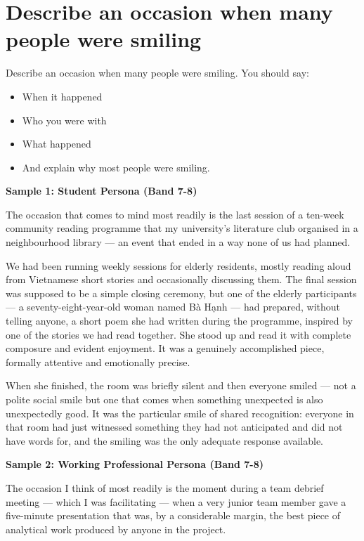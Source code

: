 \section{Describe an occasion when many people were smiling}
\begin{ieltsprompt}
Describe an occasion when many people were smiling.
You should say:
\begin{itemize}[leftmargin=2em, itemsep=2pt]
\item When it happened
\item Who you were with
\item What happened
\item And explain why most people were smiling.
\end{itemize}
\end{ieltsprompt}
\begin{ieltsanswer}
\textbf{Sample 1: Student Persona (Band 7-8)}

The occasion that comes to mind most readily is the last session of a ten-week community reading programme that my university's literature club organised in a neighbourhood library — an event that ended in a way none of us had planned.

We had been running weekly sessions for elderly residents, mostly reading aloud from Vietnamese short stories and occasionally discussing them. The final session was supposed to be a simple closing ceremony, but one of the elderly participants — a seventy-eight-year-old woman named Bà Hạnh — had prepared, without telling anyone, a short poem she had written during the programme, inspired by one of the stories we had read together. She stood up and read it with complete composure and evident enjoyment. It was a genuinely accomplished piece, formally attentive and emotionally precise.

When she finished, the room was briefly silent and then everyone smiled — not a polite social smile but one that comes when something unexpected is also unexpectedly good. It was the particular smile of shared recognition: everyone in that room had just witnessed something they had not anticipated and did not have words for, and the smiling was the only adequate response available.

\textbf{Sample 2: Working Professional Persona (Band 7-8)}

The occasion I think of most readily is the moment during a team debrief meeting — which I was facilitating — when a very junior team member gave a five-minute presentation that was, by a considerable margin, the best piece of analytical work produced by anyone in the project.


\end{ieltsanswer}
